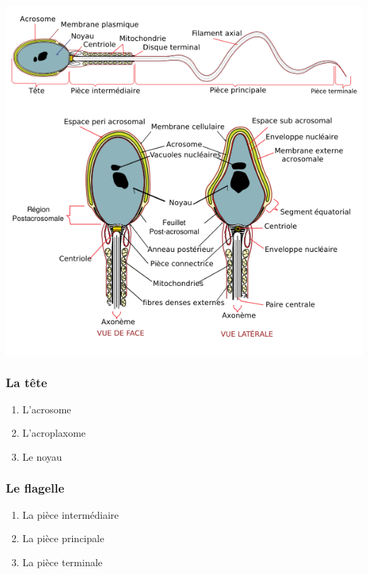\documentclass[12pt,twoside]{reedthesis}
\providecommand{\tightlist}{%
  \setlength{\itemsep}{0pt}\setlength{\parskip}{0pt}}
\theoremstyle{definition}
\theoremstyle{definition}
\theoremstyle{remark}
\begin{document}
  \begin{center}\includegraphics[scale=0.7]{figure/spermatozoide} \end{center}
  
  \subsubsection{La tête}\label{la-tete}
  
  \begin{enumerate}
  \def\labelenumi{\arabic{enumi}.}
  \tightlist
  \item
    L'acrosome\\
  \item
    L'acroplaxome\\
  \item
    Le noyau
  \end{enumerate}
  
  \subsubsection{Le flagelle}\label{le-flagelle}
  
  \begin{enumerate}
  \def\labelenumi{\arabic{enumi}.}
  \tightlist
  \item
    La pièce intermédiaire\\
  \item
    La pièce principale\\
  \item
    La pièce terminale
  \end{enumerate}
  
\end{document}
